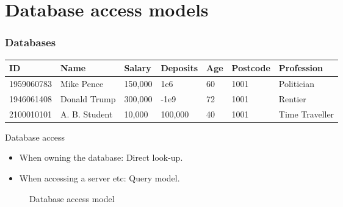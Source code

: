 \section{Database access models}

\begin{frame}
  \frametitle{Databases}
  \begin{example}
  \begin{tabular}{l|l|l|l|l|l|l}
    ID & Name &  Salary & Deposits & Age & Postcode & Profession\\
    \hline
    1959060783 & Mike Pence & 150,000 & 1e6 & 60 & 1001 & Politician\\
    1946061408 & Donald Trump & 300,000 & -1e9 & 72 & 1001 & Rentier\\
    2100010101 & A. B. Student & 10,000 & 100,000 & 40 & 1001 & Time Traveller
  \end{tabular}
\end{example}

  \begin{block}{Database access}
    \begin{itemize}
    \item When owning the database: Direct look-up.
    \item When accessing a server etc: Query model.
    \end{itemize}
  \end{block}

  \begin{figure}[H]
    \centering
    \label{fig:database-access}
    \caption{Database access model}
  \end{figure}

  
\end{frame}



